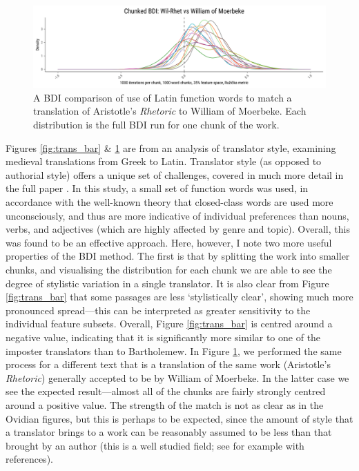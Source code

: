\documentclass[
    hf
]{ceurart}
\begin{document}
\begin{figure}
    \includegraphics[width=\linewidth]{images/bdi_wil_paper.png}
    \caption{A BDI comparison of use of Latin function words to match a
        translation of Aristotle's \emph{Rhetoric} to William of Moerbeke. Each
        distribution is the full BDI run for one chunk of the work.}
    \label{fig:trans_wil}
\end{figure}

Figures \ref{fig:trans_bar} \& \ref{fig:trans_wil} are from an analysis of translator style,
examining medieval translations from Greek to Latin. Translator style (as opposed to authorial
style) offers a unique set of challenges, covered in much more detail in the full paper
\cite{Beullens_Haverals_Nagy_2024}. In this study, a small set of function words was used, in
accordance with the well-known theory that closed-class words are used more unconsciously, and thus
are more indicative of individual preferences than nouns, verbs, and adjectives (which are highly
affected by genre and topic). Overall, this was found to be an effective approach. Here, however, I
note two more useful properties of the BDI method. The first is that by splitting the work into
smaller chunks, and visualising the distribution for each chunk we are able to see the degree of
stylistic variation in a single translator. It is also clear from Figure \ref{fig:trans_bar} that
some passages are less `stylistically clear', showing much more pronounced spread---this can be
interpreted as greater sensitivity to the individual feature subsets. Overall, Figure
\ref{fig:trans_bar} is centred around a negative value, indicating that it is significantly more
similar to one of the imposter translators than to Bartholemew. In Figure \ref{fig:trans_wil}, we
performed the same process for a different text that is a translation of the same work (Aristotle's
\emph{Rhetoric}) generally accepted to be by William of Moerbeke. In the latter case we see the
expected result---almost all of the chunks are fairly strongly centred around a positive value. The
strength of the match is not as clear as in the Ovidian figures, but this is perhaps to be expected,
since the amount of style that a translator brings to a work can be reasonably assumed to be less
than that brought by an author (this is a well studied field; see for example
\cite{rybicki2012great} with references).
\end{document}
